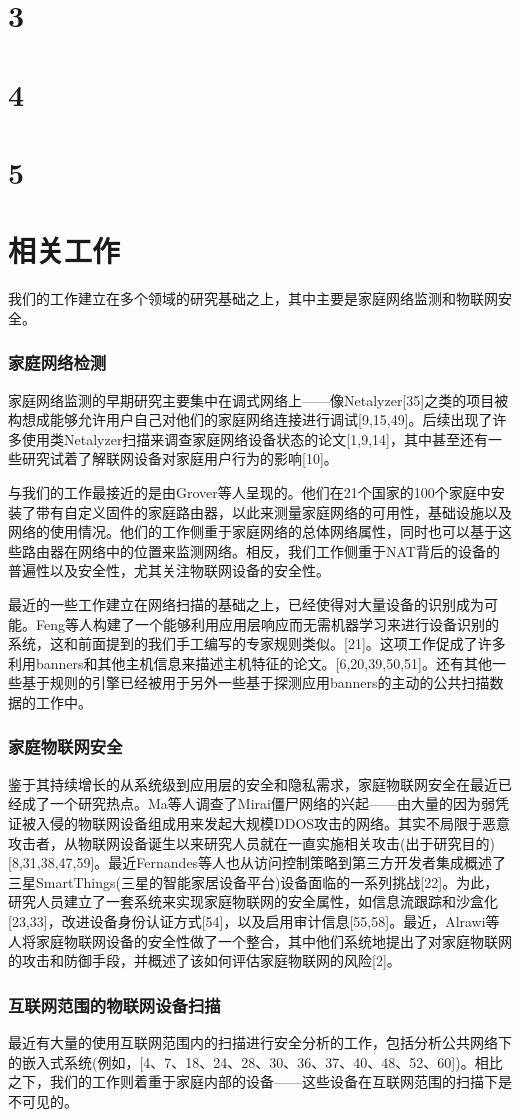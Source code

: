 \documentclass[UTF8]{ctexart}
\begin{document}
	\section{3}
	
	\section{4}
	
	\section{5}
	
	\section{相关工作}
	我们的工作建立在多个领域的研究基础之上，其中主要是家庭网络监测和物联网安全。
	
	\subsubsection*{家庭网络检测} 
	家庭网络监测的早期研究主要集中在调式网络上——像Netalyzer[35]之类的项目被构想成能够允许用户自己对他们的家庭网络连接进行调试[9,15,49]。后续出现了许多使用类Netalyzer扫描来调查家庭网络设备状态的论文[1,9,14]，其中甚至还有一些研究试着了解联网设备对家庭用户行为的影响[10]。
	
	与我们的工作最接近的是由Grover等人呈现的。他们在21个国家的100个家庭中安装了带有自定义固件的家庭路由器，以此来测量家庭网络的可用性，基础设施以及网络的使用情况。他们的工作侧重于家庭网络的总体网络属性，同时也可以基于这些路由器在网络中的位置来监测网络。相反，我们工作侧重于NAT背后的设备的普遍性以及安全性，尤其关注物联网设备的安全性。
	
	最近的一些工作建立在网络扫描的基础之上，已经使得对大量设备的识别成为可能。Feng等人构建了一个能够利用应用层响应而无需机器学习来进行设备识别的系统，这和前面提到的我们手工编写的专家规则类似。[21]。这项工作促成了许多利用banners和其他主机信息来描述主机特征的论文。[6,20,39,50,51]。还有其他一些基于规则的引擎已经被用于另外一些基于探测应用banners的主动的公共扫描数据的工作中。
	
	\subsubsection*{家庭物联网安全}
	鉴于其持续增长的从系统级到应用层的安全和隐私需求，家庭物联网安全在最近已经成了一个研究热点。Ma等人调查了Mirai僵尸网络的兴起——由大量的因为弱凭证被入侵的物联网设备组成用来发起大规模DDOS攻击的网络。其实不局限于恶意攻击者，从物联网设备诞生以来研究人员就在一直实施相关攻击(出于研究目的)[8,31,38,47,59]。最近Fernandes等人也从访问控制策略到第三方开发者集成概述了三星SmartThings(三星的智能家居设备平台)设备面临的一系列挑战[22]。为此，研究人员建立了一套系统来实现家庭物联网的安全属性，如信息流跟踪和沙盒化[23,33]，改进设备身份认证方式[54]，以及启用审计信息[55,58]。最近，Alrawi等人将家庭物联网设备的安全性做了一个整合，其中他们系统地提出了对家庭物联网的攻击和防御手段，并概述了该如何评估家庭物联网的风险[2]。
	
	\subsubsection*{互联网范围的物联网设备扫描}
	最近有大量的使用互联网范围内的扫描进行安全分析的工作，包括分析公共网络下的嵌入式系统(例如，[4、7、18、24、28、30、36、37、40、48、52、60])。相比之下，我们的工作则着重于家庭内部的设备——这些设备在互联网范围的扫描下是不可见的。
	
\end{document}
